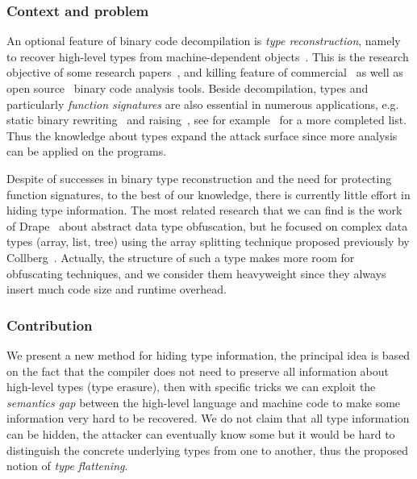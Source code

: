 \documentclass[compsoc,conference,a4paper,10pt,times]{IEEEtran}
\begin{document}
\subsubsection*{Context and problem}
An optional feature of binary code decompilation is \emph{type reconstruction}, namely to recover high-level types from machine-dependent
objects~\cite{mycroft_type-based_1999, van_emmerik_static_2007}. This is the research objective of some
research papers~\cite{lee_tie_2011,elwazeer_scalable_2013,robbins_minx_2016,noonan_polymorphic_2016},
and killing feature of commercial~\cite{noauthor_hex-rays_nodate,noauthor_jeb_nodate}
as well as open source~\cite{noauthor_ghidra_nodate} binary code analysis tools. Beside decompilation,
types and particularly \emph{function signatures} are also essential in numerous applications,
e.g. static binary rewriting~\cite{bernat_anywhere_2011,anand_compiler-level_2013} and
raising~\cite{yadavalli_raising_2019,goodman_lifting_2018},
see for example~\cite{caballero_type_2016} for a more completed list. Thus the knowledge about types
expand the attack surface since more analysis can be applied on the programs.

Despite of successes in binary type reconstruction and the need for protecting function signatures, to the best
of our knowledge, there is currently little effort in hiding type information. The most related research that we
can find is the work of Drape~\cite{drape_generalising_2007,drape_obfuscation_2004,drape_obfuscation_2006}
about abstract data type obfuscation, but he focused on complex data types (array, list, tree) using
the array splitting technique proposed previously by Collberg~\cite{collberg_taxonomy_1997}.
Actually, the structure of such a
type makes more room for obfuscating techniques, and we consider them heavyweight since they
always insert much code size and runtime overhead.

\subsubsection*{Contribution}
We present a new method for hiding type information, the principal idea is based on the fact that the compiler does not need to preserve all information
about high-level types (type erasure), then with specific tricks we can exploit the \emph{semantics gap} between
the high-level language and machine code to make some information very hard
to be recovered. We do not claim that all type information can be hidden, the attacker can
eventually know some but it would be hard to distinguish the concrete underlying types from one to another,
thus the proposed notion of \emph{type flattening}.
\end{document}
